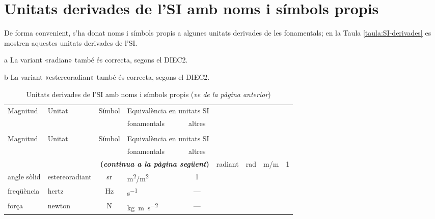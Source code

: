 \section{Unitats derivades de l'SI amb noms i símbols propis}
\label{sec:unitata-derv-SI}

De forma convenient, s'ha donat noms i símbols propis a algunes unitats derivades de les fonamentals; en la Taula \vref{taula:SI-derivades} es mostren aquestes unitats derivades de l'SI.

\begin{ThreePartTable}
\begin{TableNotes}
    \item[a] {\footnotesize La variant «radian» també és correcta, segons el DIEC2.}
    \item[b] {\footnotesize La variant «estereoradian» també és correcta, segons el DIEC2.}
\end{TableNotes}
\begin{longtable}[h]{llclc}
   \caption{\label{taula:SI-derivades} Unitats derivades de
   l'SI amb noms i símbols propis}\\
   \toprule[1pt]
    \multirow{2}{15mm}{\rule{0mm}{6mm}Magnitud} & \multirow{2}{15mm}{\rule{0mm}{6mm}Unitat}  &
    \multirow{2}{15mm}{\rule{0mm}{6mm}Símbol}  & \multicolumn{2}{c}{Equivalència en unitats SI}\\
    \cmidrule(rl){4-5}
    &  &   & fonamentals & altres\\
   \midrule
   \endfirsthead
   \caption[]{Unitats derivades de l'SI amb noms i símbols propis (\emph{ve de la pàgina
   anterior})}\\
   \toprule[1pt]
    \multirow{2}{15mm}{\rule{0mm}{6mm}Magnitud} & \multirow{2}{15mm}{\rule{0mm}{6mm}Unitat}  &
    \multirow{2}{15mm}{\rule{0mm}{6mm}Símbol}  & \multicolumn{2}{c}{Equivalència en unitats SI}\\
    \cmidrule(rl){4-5}
    &  &  & fonamentals & altres\\
   \midrule
   \endhead
   \midrule
   \multicolumn{5}{r}{\sffamily\bfseries\color{NavyBlue}(\emph{continua a la pàgina següent})}
   \endfoot
   \insertTableNotes
   \endlastfoot
   angle pla & radiant\tnote{a} & rad   & \unit{m/m} & 1\\
   angle sòlid & estereoradiant\tnote{b} & sr & \unit{m^2/m^2}  & 1 \\
   freqüència & hertz & Hz & \unit{s^{-1}} & --- \\
   força & newton & N & \unit{kg.m.s^{-2}} & --- \\

\end{longtable}
\end{ThreePartTable}

